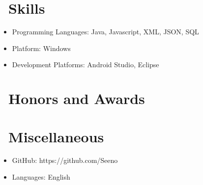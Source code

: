 \documentclass{resume}
\begin{document}
\section{\faCogs\ Skills}
\begin{itemize}[parsep=0.5ex]
  \item Programming Languages: Java, Javascript, XML, JSON, SQL
  \item Platform: Windows
  \item Development Platforms: Android Studio, Eclipse
\end{itemize}

\section{\faHeartO\ Honors and Awards}

\section{\faInfo\ Miscellaneous}
\begin{itemize}[parsep=0.5ex]
  \item GitHub: https://github.com/Seeno
  \item Languages: English
\end{itemize}

%
%
\end{document}
